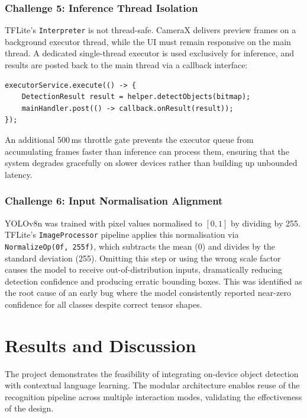 \documentclass[a4paper, 12pt]{article}
\begin{document}
    \subsubsection{Challenge 5: Inference Thread Isolation}

    TFLite's \texttt{Interpreter} is not thread-safe. CameraX delivers preview frames on a background executor thread, while the UI must remain responsive on the main thread. A dedicated single-thread executor is used exclusively for inference, and results are posted back to the main thread via a callback interface:

\begin{verbatim}
executorService.execute(() -> {
    DetectionResult result = helper.detectObjects(bitmap);
    mainHandler.post(() -> callback.onResult(result));
});
\end{verbatim}

    An additional 500\,ms throttle gate prevents the executor queue from accumulating frames faster than inference can process them, ensuring that the system degrades gracefully on slower devices rather than building up unbounded latency.

    \subsubsection{Challenge 6: Input Normalisation Alignment}

    YOLOv8n was trained with pixel values normalised to $[0, 1]$ by dividing by 255. TFLite's \texttt{ImageProcessor} pipeline applies this normalisation via \texttt{NormalizeOp(0f, 255f)}, which subtracts the mean (0) and divides by the standard deviation (255). Omitting this step or using the wrong scale factor causes the model to receive out-of-distribution inputs, dramatically reducing detection confidence and producing erratic bounding boxes. This was identified as the root cause of an early bug where the model consistently reported near-zero confidence for all classes despite correct tensor shapes.

    \section{Results and Discussion}

    The project demonstrates the feasibility of integrating on-device object detection with contextual language learning. The modular architecture enables reuse of the recognition pipeline across multiple interaction modes, validating the effectiveness of the design.
\end{document}
